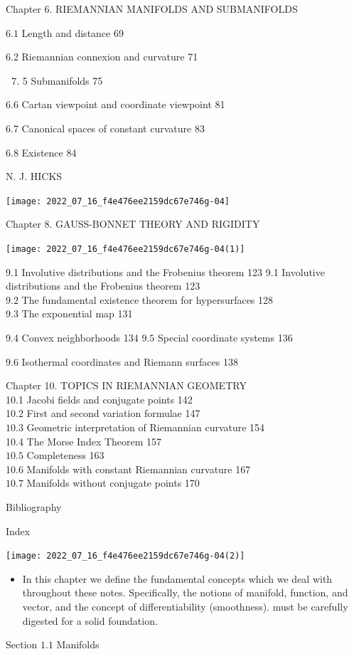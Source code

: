 \documentclass[10pt]{article}
\begin{document}
Chapter 6. RIEMANNIAN MANIFOLDS AND SUBMANIFOLDS

$6.1$ Length and distance 69

6.2 Riemannian connexion and curvature 71

\begin{enumerate}
  \setcounter{enumi}{6}
  \item 5 Submanifolds 75
\end{enumerate}
6.6 Cartan viewpoint and coordinate viewpoint 81

6.7 Canonical spaces of constant curvature 83

$6.8$ Existence 84

N. J. HICKS

\texttt{[image: 2022\_07\_16\_f4e476ee2159dc67e746g-04]}

Chapter 8. GAUSS-BONNET THEORY AND RIGIDITY

\texttt{[image: 2022\_07\_16\_f4e476ee2159dc67e746g-04(1)]}

9.1 Involutive distributions and the Frobenius theorem 123 9.1 Involutive distributions and the Frobenius theorem 123\\
$9.2$ The fundamental existence theorem for hypersurfaces 128\\
$9.3$ The exponential map 131

9.4 Convex neighborhoods 134 $9.5$ Special coordinate systems 136

$9.6$ Isothermal coordinates and Riemann surfaces 138

Chapter 10. TOPICS IN RIEMANNIAN GEOMETRY\\
10.1 Jacobi fields and conjugate points 142\\
10.2 First and second variation formulae 147\\
$10.3$ Geometric interpretation of Riemannian curvature 154\\
10.4 The Morse Index Theorem 157\\
$10.5$ Completeness 163\\
10.6 Manifolds with constant Riemannian curvature 167\\
$10.7$ Manifolds without conjugate points 170

Bibliography

Index

\texttt{[image: 2022\_07\_16\_f4e476ee2159dc67e746g-04(2)]}

\begin{itemize}
  \item In this chapter we define the fundamental concepts which we deal with throughout these notes. Specifically, the notions of manifold, function, and vector, and the concept of differentiability (smoothness). must be carefully digested for a solid foundation.
\end{itemize}
Section $1.1$ Manifolds
\end{document}
